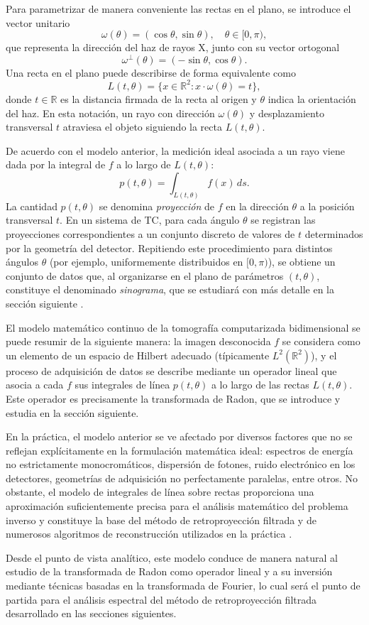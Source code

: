 Para parametrizar de manera conveniente las rectas en el plano, se introduce el vector unitario
\[
\omega(\theta) = (\cos\theta,\sin\theta), \quad \theta \in [0,\pi),
\]
que representa la dirección del haz de rayos X, junto con su vector ortogonal
\[
\omega^{\perp}(\theta) = (-\sin\theta,\cos\theta).
\]
Una recta en el plano puede describirse de forma equivalente como
\[
L(t,\theta) = \{ x \in \mathbb{R}^{2} : x \cdot \omega(\theta) = t \},
\]
donde $t \in \mathbb{R}$ es la distancia firmada de la recta al origen y $\theta$ indica la orientación del haz. En esta notación, un rayo con dirección $\omega(\theta)$ y desplazamiento transversal $t$ atraviesa el objeto siguiendo la recta $L(t,\theta)$.

De acuerdo con el modelo anterior, la medición ideal asociada a un rayo viene dada por la integral de $f$ a lo largo de $L(t,\theta)$:
\[
p(t,\theta) = \int_{L(t,\theta)} f(x)\, ds.
\]
La cantidad $p(t,\theta)$ se denomina \emph{proyección} de $f$ en la dirección $\theta$ a la posición transversal $t$. En un sistema de TC, para cada ángulo $\theta$ se registran las proyecciones correspondientes a un conjunto discreto de valores de $t$ determinados por la geometría del detector. Repitiendo este procedimiento para distintos ángulos $\theta$ (por ejemplo, uniformemente distribuidos en $[0,\pi)$), se obtiene un conjunto de datos que, al organizarse en el plano de parámetros $(t,\theta)$, constituye el denominado \emph{sinograma}, que se estudiará con más detalle en la sección siguiente \cite{kak_slaney1988}.

El modelo matemático continuo de la tomografía computarizada bidimensional se puede resumir de la siguiente manera: la imagen desconocida $f$ se considera como un elemento de un espacio de Hilbert adecuado (típicamente $L^{2}(\mathbb{R}^{2})$), y el proceso de adquisición de datos se describe mediante un operador lineal que asocia a cada $f$ sus integrales de línea $p(t,\theta)$ a lo largo de las rectas $L(t,\theta)$. Este operador es precisamente la transformada de Radon, que se introduce y estudia en la sección siguiente.

En la práctica, el modelo anterior se ve afectado por diversos factores que no se reflejan explícitamente en la formulación matemática ideal: espectros de energía no estrictamente monocromáticos, dispersión de fotones, ruido electrónico en los detectores, geometrías de adquisición no perfectamente paralelas, entre otros. No obstante, el modelo de integrales de línea sobre rectas proporciona una aproximación suficientemente precisa para el análisis matemático del problema inverso y constituye la base del método de retroproyección filtrada y de numerosos algoritmos de reconstrucción utilizados en la práctica \cite{kak_slaney1988,natterer2001,kuchment2014}.

Desde el punto de vista analítico, este modelo conduce de manera natural al estudio de la transformada de Radon como operador lineal y a su inversión mediante técnicas basadas en la transformada de Fourier, lo cual será el punto de partida para el análisis espectral del método de retroproyección filtrada desarrollado en las secciones siguientes.